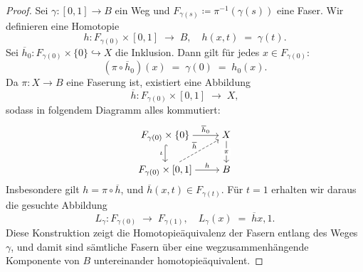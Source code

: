 \documentclass[12pt]{article}
\numberwithin{conj}{section}
\begin{document}
    \begin{proof}
        Sei $\gamma : [0,1] \to B$ ein Weg und $F_{\gamma(s)}\coloneqq \pi^{-1}(\gamma
        (s))$ eine Faser. Wir definieren eine Homotopie
        \[
            h : F_{\gamma(0)}\times [0,1] \;\longrightarrow\; B, \quad h(x,t) \;=\; \gamma
            (t).
        \]
        Sei $\overline{h}_{0} : F_{\gamma(0)}\times \{0\} \hookrightarrow X$ die
        Inklusion. Dann gilt für jedes $x \in F_{\gamma(0)}$:
        \[
            (\pi \circ \overline{h}_{0})(x) \;=\; \gamma(0) \;=\; h_{0}(x).
        \]
        Da $\pi : X \to B$ eine Faserung ist, existiert eine Abbildung
        \[
            \overline{h}: F_{\gamma(0)}\times [0,1] \;\longrightarrow\; X,
        \]
        sodass in folgendem Diagramm alles kommutiert:
        \[
            \begin{tikzcd}
                [cramped] {F_{\gamma(0)}\times\{0\}} & X \\ {F_{\gamma(0)}\times[0,1]} &
                B \arrow["{\overline{h}_0}", from=1-1, to=1-2] \arrow["\iota"', hook, from=1-1,
                to=2-1] \arrow["\pi"{description}, from=1-2, to=2-2] \arrow["{\overline{h}}",
                dashed, from=2-1, to=1-2] \arrow["h", from=2-1, to=2-2]
            \end{tikzcd}
        \]
        Insbesondere gilt $h = \pi \circ \overline{h}$, und $\overline{h}(x,t) \in F_{\gamma(t)}$.
        Für $t=1$ erhalten wir daraus die gesuchte Abbildung
        \[
            L_{\gamma} : F_{\gamma(0)}\;\longrightarrow\; F_{\gamma(1)}, \quad L_{\gamma}
            (x) \;=\; \overline{h} x,1 .
        \]
        Diese Konstruktion zeigt die Homotopieäquivalenz der Fasern entlang des
        Weges $\gamma$, und damit sind sämtliche Fasern über eine wegzusammenhängende
        Komponente von $B$ untereinander homotopieäquivalent.
    \end{proof}
\end{document}
